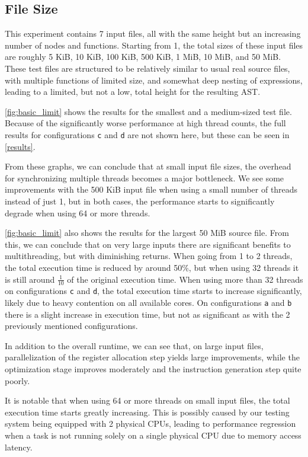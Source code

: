 \documentclass[12pt,dvipsnames]{article}
\newcommand{\mono}[1]{\texttt{#1}}
\begin{document}
\subsection{File Size} \label{filesize}
This experiment contains 7 input files, all with the same height but an increasing number of nodes and functions. Starting from 1, the total sizes of these input files are roughly 5 KiB, 10 KiB, 100 KiB, 500 KiB, 1 MiB, 10 MiB, and 50 MiB. These test files are structured to be relatively similar to usual real source files, with multiple functions of limited size, and somewhat deep nesting of expressions, leading to a limited, but not a low, total height for the resulting AST.

\autoref{fig:basic_limit} shows the results for the smallest and a medium-sized test file. Because of the significantly worse performance at high thread counts, the full results for configurations \mono{c} and \mono{d} are not shown here, but these can be seen in \autoref{results}.

From these graphs, we can conclude that at small input file sizes, the overhead for synchronizing multiple threads becomes a major bottleneck. We see some improvements with the 500 KiB input file when using a small number of threads instead of just 1, but in both cases, the performance starts to significantly degrade when using 64 or more threads.

\autoref{fig:basic_limit} also shows the results for the largest 50 MiB source file. From this, we can conclude that on very large inputs there are significant benefits to multithreading, but with diminishing returns. When going from 1 to 2 threads, the total execution time is reduced by around 50\%, but when using 32 threads it is still around $\frac{1}{10}$ of the original execution time. When using more than 32 threads on configurations \mono{c} and \mono{d}, the total execution time starts to increase significantly, likely due to heavy contention on all available cores. On configurations \mono{a} and \mono{b} there is a slight increase in execution time, but not as significant as with the 2 previously mentioned configurations.

In addition to the overall runtime, we can see that, on large input files, parallelization of the register allocation step yields large improvements, while the optimization stage improves moderately and the instruction generation step quite poorly.

It is notable that when using 64 or more threads on small input files, the total execution time starts greatly increasing. This is possibly caused by our testing system being equipped with 2 physical CPUs, leading to performance regression when a task is not running solely on a single physical CPU due to memory access latency.
\end{document}
